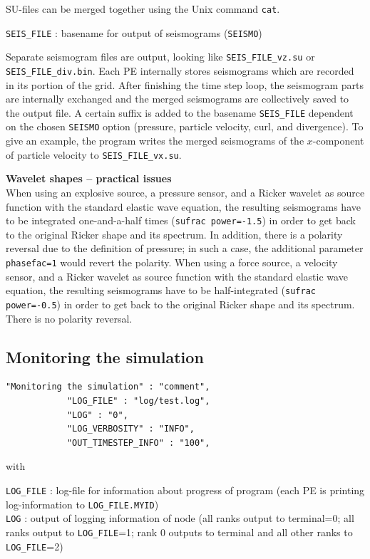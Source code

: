 SU-files can be merged together using the Unix command \texttt{cat}. 

\texttt{SEIS\_FILE} : basename for output of seismograms (\texttt{SEISMO})

Separate seismogram files are output, looking like \texttt{SEIS\_FILE\_vz.su} or \texttt{SEIS\_FILE\_div.bin}. Each PE internally stores seismograms which are recorded in its portion of the grid. After finishing the time step loop, the seismogram parts are internally exchanged and the merged seismograms are collectively saved to the output file. A certain suffix is added to the basename \texttt{SEIS\_FILE} dependent on the chosen \texttt{SEISMO} option (pressure, particle velocity, curl, and divergence). To give an example, the program writes the merged seismograms of the $x$-component of particle velocity to \texttt{SEIS\_FILE\_vx.su}.

\textbf{Wavelet shapes -- practical issues}\\
When using an explosive source, a pressure sensor, and a Ricker wavelet as source function with the standard elastic wave equation, the resulting seismograms have to be integrated one-and-a-half times (\texttt{sufrac power=-1.5}) in order to get back to the original Ricker shape and its spectrum. In addition, there is a polarity reversal due to the definition of pressure; in such a case, the additional parameter \texttt{phasefac=1} would revert the polarity. When using a force source, a velocity sensor, and a Ricker wavelet as source function with the standard elastic wave equation, the resulting seismograms have to be half-integrated (\texttt{sufrac power=-0.5}) in order to get back to the original Ricker shape and its spectrum. There is no polarity reversal.

\subsection{Monitoring the simulation}
\begin{verbatim}
"Monitoring the simulation" : "comment",
            "LOG_FILE" : "log/test.log",
            "LOG" : "0",
            "LOG_VERBOSITY" : "INFO",
            "OUT_TIMESTEP_INFO" : "100",
\end{verbatim}

with

\texttt{LOG\_FILE} : log-file for information about progress of program (each PE is printing log-information to \texttt{LOG\_FILE.MYID})\\
\texttt{LOG} : output of logging information of node (all ranks output to terminal=0; all ranks output to \texttt{LOG\_FILE}=1; rank 0 outputs to terminal and all other ranks to \texttt{LOG\_FILE}=2)

